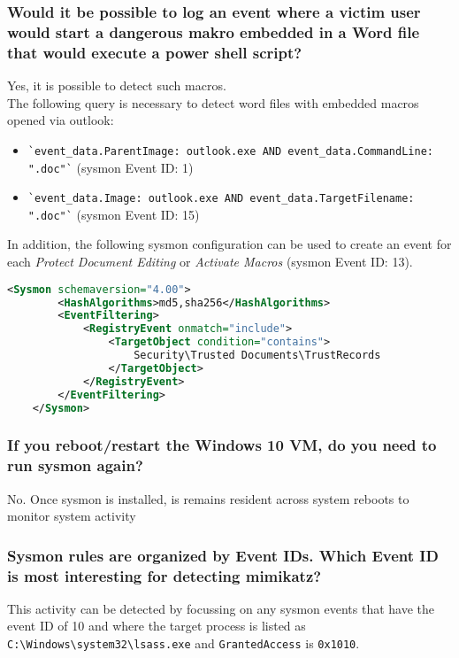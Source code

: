 \newpage

\subsubsection{Would it be possible to log an event where a victim user would start a dangerous makro embedded in a Word file that would execute a power shell script?}
Yes, it is possible to detect such macros.\\
The following query is necessary to detect word files with embedded macros opened via outlook:\\
\begin{itemize}
    \item \lstinline|`event_data.ParentImage: outlook.exe AND event_data.CommandLine: ".doc"`| (sysmon Event ID: 1)
    \item \lstinline|`event_data.Image: outlook.exe AND event_data.TargetFilename: ".doc"`| (sysmon Event ID: 15)\\
\end{itemize}

In addition, the following sysmon configuration can be used to create an event for each \textit{Protect Document Editing} or \textit{Activate Macros} (sysmon Event ID: 13).

\begin{lstlisting}[language=XML]
    <Sysmon schemaversion="4.00">
        <HashAlgorithms>md5,sha256</HashAlgorithms>
        <EventFiltering>
            <RegistryEvent onmatch="include">
                <TargetObject condition="contains">
                    Security\Trusted Documents\TrustRecords
                </TargetObject>
            </RegistryEvent>
        </EventFiltering>
    </Sysmon>
\end{lstlisting}

\subsubsection{If you reboot/restart the Windows 10 VM, do you need to run sysmon again?}
No. Once sysmon is installed, is remains resident across system reboots to monitor system activity

\subsubsection{Sysmon rules are organized by Event IDs. Which Event ID is most interesting for detecting mimikatz?}
This activity can be detected by focussing on any sysmon events that have the event ID of 10 and where the target process is listed as \lstinline|C:\Windows\system32\lsass.exe| and \lstinline|GrantedAccess| is \lstinline|0x1010|.

